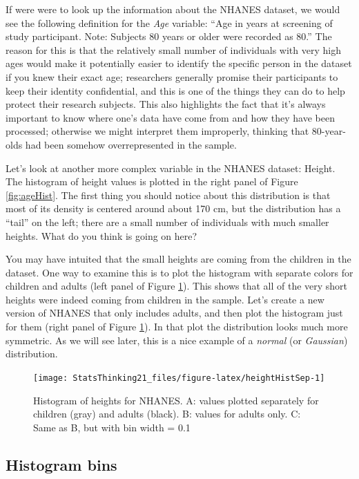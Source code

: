\documentclass[12pt,]{book}
\theoremstyle{definition}
\theoremstyle{definition}
\theoremstyle{definition}
\theoremstyle{remark}
\begin{document}
If were were to look up the information about the NHANES dataset, we would see the following definition for the \emph{Age} variable: ``Age in years at screening of study participant. Note: Subjects 80 years or older were recorded as 80.'' The reason for this is that the relatively small number of individuals with very high ages would make it potentially easier to identify the specific person in the dataset if you knew their exact age; researchers generally promise their participants to keep their identity confidential, and this is one of the things they can do to help protect their research subjects. This also highlights the fact that it's always important to know where one's data have come from and how they have been processed; otherwise we might interpret them improperly, thinking that 80-year-olds had been somehow overrepresented in the sample.

Let's look at another more complex variable in the NHANES dataset: Height. The histogram of height values is plotted in the right panel of Figure \ref{fig:ageHist}. The first thing you should notice about this distribution is that most of its density is centered around about 170 cm, but the distribution has a ``tail'' on the left; there are a small number of individuals with much smaller heights. What do you think is going on here?

You may have intuited that the small heights are coming from the children in the dataset. One way to examine this is to plot the histogram with separate colors for children and adults (left panel of Figure \ref{fig:heightHistSep}). This shows that all of the very short heights were indeed coming from children in the sample. Let's create a new version of NHANES that only includes adults, and then plot the histogram just for them (right panel of Figure \ref{fig:heightHistSep}). In that plot the distribution looks much more symmetric. As we will see later, this is a nice example of a \emph{normal} (or \emph{Gaussian}) distribution.

\begin{figure}
\texttt{[image: StatsThinking21\_files/figure-latex/heightHistSep-1]} \caption{Histogram of heights for NHANES. A: values plotted separately for children (gray) and adults (black).  B: values for adults only. C: Same as B, but with bin width = 0.1}\label{fig:heightHistSep}
\end{figure}

\hypertarget{histogram-bins}{%
\subsection{Histogram bins}\label{histogram-bins}}
\end{document}
